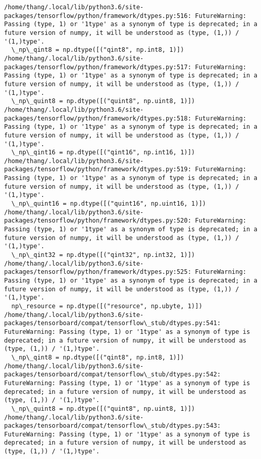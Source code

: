 \documentclass[11pt]{article}
\begin{document}
    \begin{Verbatim}[commandchars=\\\{\}]
/home/thang/.local/lib/python3.6/site-packages/tensorflow/python/framework/dtypes.py:516: FutureWarning: Passing (type, 1) or '1type' as a synonym of type is deprecated; in a future version of numpy, it will be understood as (type, (1,)) / '(1,)type'.
  \_np\_qint8 = np.dtype([("qint8", np.int8, 1)])
/home/thang/.local/lib/python3.6/site-packages/tensorflow/python/framework/dtypes.py:517: FutureWarning: Passing (type, 1) or '1type' as a synonym of type is deprecated; in a future version of numpy, it will be understood as (type, (1,)) / '(1,)type'.
  \_np\_quint8 = np.dtype([("quint8", np.uint8, 1)])
/home/thang/.local/lib/python3.6/site-packages/tensorflow/python/framework/dtypes.py:518: FutureWarning: Passing (type, 1) or '1type' as a synonym of type is deprecated; in a future version of numpy, it will be understood as (type, (1,)) / '(1,)type'.
  \_np\_qint16 = np.dtype([("qint16", np.int16, 1)])
/home/thang/.local/lib/python3.6/site-packages/tensorflow/python/framework/dtypes.py:519: FutureWarning: Passing (type, 1) or '1type' as a synonym of type is deprecated; in a future version of numpy, it will be understood as (type, (1,)) / '(1,)type'.
  \_np\_quint16 = np.dtype([("quint16", np.uint16, 1)])
/home/thang/.local/lib/python3.6/site-packages/tensorflow/python/framework/dtypes.py:520: FutureWarning: Passing (type, 1) or '1type' as a synonym of type is deprecated; in a future version of numpy, it will be understood as (type, (1,)) / '(1,)type'.
  \_np\_qint32 = np.dtype([("qint32", np.int32, 1)])
/home/thang/.local/lib/python3.6/site-packages/tensorflow/python/framework/dtypes.py:525: FutureWarning: Passing (type, 1) or '1type' as a synonym of type is deprecated; in a future version of numpy, it will be understood as (type, (1,)) / '(1,)type'.
  np\_resource = np.dtype([("resource", np.ubyte, 1)])
/home/thang/.local/lib/python3.6/site-packages/tensorboard/compat/tensorflow\_stub/dtypes.py:541: FutureWarning: Passing (type, 1) or '1type' as a synonym of type is deprecated; in a future version of numpy, it will be understood as (type, (1,)) / '(1,)type'.
  \_np\_qint8 = np.dtype([("qint8", np.int8, 1)])
/home/thang/.local/lib/python3.6/site-packages/tensorboard/compat/tensorflow\_stub/dtypes.py:542: FutureWarning: Passing (type, 1) or '1type' as a synonym of type is deprecated; in a future version of numpy, it will be understood as (type, (1,)) / '(1,)type'.
  \_np\_quint8 = np.dtype([("quint8", np.uint8, 1)])
/home/thang/.local/lib/python3.6/site-packages/tensorboard/compat/tensorflow\_stub/dtypes.py:543: FutureWarning: Passing (type, 1) or '1type' as a synonym of type is deprecated; in a future version of numpy, it will be understood as (type, (1,)) / '(1,)type'.

\end{Verbatim}
\end{document}
